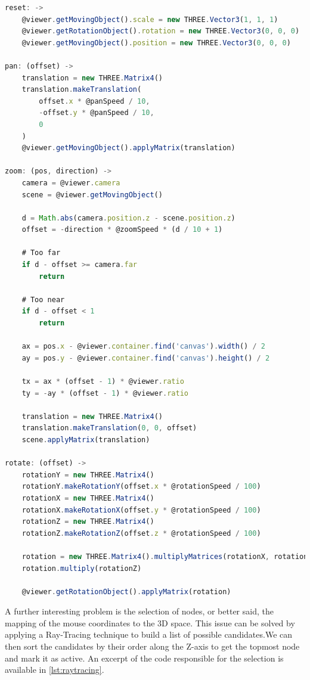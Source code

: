 \begin{lstlisting}[caption={Viewport modification functions.},label=lst:viewport,language=javascript]
reset: ->
    @viewer.getMovingObject().scale = new THREE.Vector3(1, 1, 1)
    @viewer.getRotationObject().rotation = new THREE.Vector3(0, 0, 0)
    @viewer.getMovingObject().position = new THREE.Vector3(0, 0, 0)

pan: (offset) ->
    translation = new THREE.Matrix4()
    translation.makeTranslation(
        offset.x * @panSpeed / 10,
        -offset.y * @panSpeed / 10,
        0
    )
    @viewer.getMovingObject().applyMatrix(translation)

zoom: (pos, direction) ->
    camera = @viewer.camera
    scene = @viewer.getMovingObject()

    d = Math.abs(camera.position.z - scene.position.z)
    offset = -direction * @zoomSpeed * (d / 10 + 1)

    # Too far
    if d - offset >= camera.far
        return

    # Too near
    if d - offset < 1
        return

    ax = pos.x - @viewer.container.find('canvas').width() / 2
    ay = pos.y - @viewer.container.find('canvas').height() / 2

    tx = ax * (offset - 1) * @viewer.ratio
    ty = -ay * (offset - 1) * @viewer.ratio

    translation = new THREE.Matrix4()
    translation.makeTranslation(0, 0, offset)
    scene.applyMatrix(translation)

rotate: (offset) ->
    rotationY = new THREE.Matrix4()
    rotationY.makeRotationY(offset.x * @rotationSpeed / 100)
    rotationX = new THREE.Matrix4()
    rotationX.makeRotationX(offset.y * @rotationSpeed / 100)
    rotationZ = new THREE.Matrix4()
    rotationZ.makeRotationZ(offset.z * @rotationSpeed / 100)

    rotation = new THREE.Matrix4().multiplyMatrices(rotationX, rotationY)
    rotation.multiply(rotationZ)

    @viewer.getRotationObject().applyMatrix(rotation)
\end{lstlisting}

A further interesting problem is the selection of nodes, or better said, the mapping of the mouse coordinates to the 3D space. This issue can be solved by applying a Ray-Tracing technique to build a list of possible candidates.We can then sort the candidates by their order along the Z-axis to get the topmost node and mark it as active. An excerpt of the code responsible for the selection is available in \vref{lst:raytracing}.


